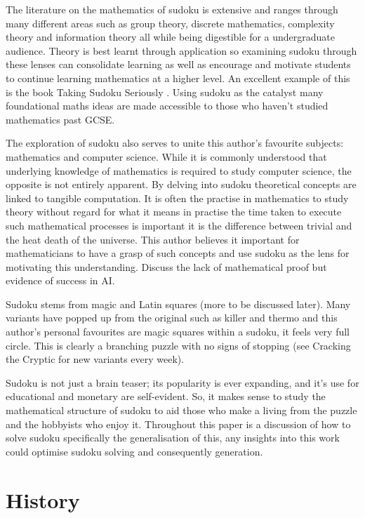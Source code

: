 \documentclass[a4paper,11pt]{report}
\begin{document}
The literature on the mathematics of sudoku is extensive and ranges through many different areas such as group theory, discrete mathematics, complexity theory and information theory all while being digestible for a undergraduate audience. Theory is best learnt through application so examining sudoku through these lenses can consolidate learning as well as encourage and motivate students to continue learning mathematics at a higher level. An excellent example of this is the book Taking Sudoku Seriously \cite{takingsudokuseriously}. Using sudoku as the catalyst many foundational maths ideas are made accessible to those who haven't studied mathematics past GCSE.

The exploration of sudoku also serves to unite this author’s favourite subjects: mathematics and computer science. While it is commonly understood that underlying knowledge of mathematics is required to study computer science, the opposite is not entirely apparent. By delving into sudoku theoretical concepts are linked to tangible computation. It is often the practise in mathematics to study theory without regard for what it means in practise the time taken to execute such mathematical processes is important it is the difference between trivial and the heat death of the universe. This author believes it important for mathematicians to have a grasp of such concepts and use sudoku as the lens for motivating this understanding. Discuss the lack of mathematical proof but evidence of success in AI.

Sudoku stems from magic and Latin squares (more to be discussed later). Many variants have popped up from the original such as killer and thermo and this author’s personal favourites are magic squares within a sudoku, it feels very full circle. This is clearly a branching puzzle with no signs of stopping (see Cracking the Cryptic for new variants every week).

Sudoku is not just a brain teaser; its popularity is ever expanding, and it's use for educational and monetary are self-evident. So, it makes sense to study the mathematical structure of sudoku to aid those who make a living from the puzzle and the hobbyists who enjoy it. Throughout this paper is a discussion of how to solve sudoku specifically the generalisation of this, any insights into this work could optimise sudoku solving and consequently generation.

\section{History}
\end{document}
